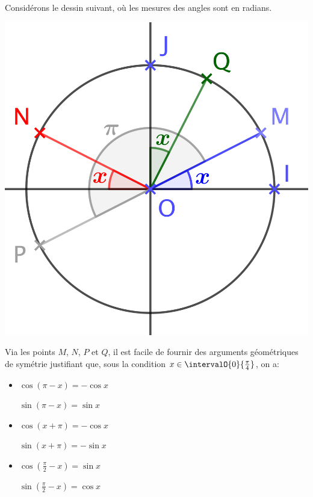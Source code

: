 Considérons le dessin suivant, où les mesures des angles sont en radians.

\begin{center}
	\includegraphics[scale = .7]{one-var-trig-formulas.png}
\end{center}

Via les points $M$, $N$, $P$ et $Q$, il est facile de fournir des arguments géométriques de symétrie justifiant que, sous la condition $x \in \intervalO{0}{\frac{\pi}{4}}$, on a:
%
\begin{multicols}{3}
\begin{itemize}[label=\small\textbullet]
	\item $\cos (\pi - x) = - \cos x$

	      \noindent
	      $\sin (\pi - x) = \sin x$ 

	\item $\cos (x + \pi) = - \cos x$

	      \noindent
	      $\sin (x + \pi) = - \sin x$

	\item $\cos \left( \frac{\pi}{2} - x \right) = \sin x$

	      \noindent
	      $\sin \left( \frac{\pi}{2} - x \right) = \cos x$ 
\end{itemize}
\end{multicols}


